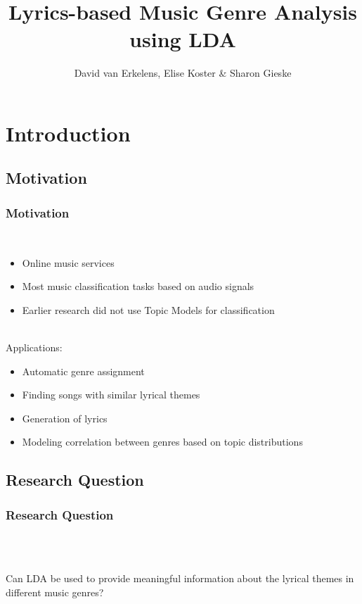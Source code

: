 \documentclass[t,ignorenonframetext]{beamer}
\title{Lyrics-based Music Genre Analysis using LDA}
\author{David van Erkelens, Elise Koster \& Sharon Gieske}
\begin{document}
\frame{
\maketitle
}
\frame{
\tableofcontents
}

\section[Introduction]{Introduction}

\subsection{Motivation}
\begin{frame}
\frametitle{Motivation}
~\\
\begin{itemize}
	\item Online music services 
	\item Most music classification tasks based on audio signals 
	\item Earlier research did not use Topic Models for classification
\end{itemize}
~\\Applications:
\begin{itemize}
\item Automatic genre assignment
\item Finding songs with similar lyrical themes
\item Generation of lyrics
\item Modeling correlation between genres based on topic distributions
\end{itemize}
\end{frame}

\subsection{Research Question}
\begin{frame}
\frametitle{Research Question}
~\\~\\
\begin{center}
\Large{Can LDA be used to provide meaningful information about the lyrical themes in different music genres?}
\end{center}
~\\~\\
\end{frame}
\end{document}
